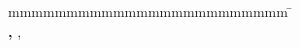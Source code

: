 \begin{titlepage}
\vfill

\flushleft
\begin{spacing}{1.2}
\begin{tabbing}
		mmmmmmmmmmmmmmmmmmmmmmmm              \= \kill
		\textbf{\langdbbearbeitungszeit} \> \zeitraum\\
		\textbf{\langdbmatriknr, \langdbkurs} \> \matrikelnr, \kurs\\
		\textbf{\langdbfirma} \> \firma\\
								\> \firmenort\\
		\textbf{\langdbbetreuer} \> \betreuer\\
		\textbf{\langdbgutachter}              \>  \gutachter\\
\end{tabbing}
\end{spacing}
\vspace{1cm}

\vspace{1cm}
\restoregeometry
\end{titlepage}
